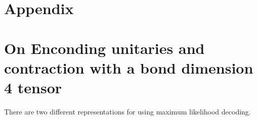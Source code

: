 \section*{Appendix}

\section{On Enconding unitaries and contraction with a bond dimension 4 tensor}
There are two different representations for using maximum likelihood decoding. 

